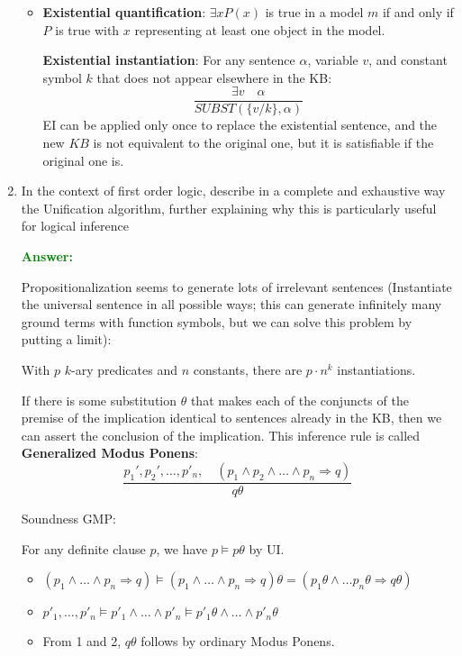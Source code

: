 \documentclass[12pt]{article}
\begin{document}
\begin{enumerate}[label=\textbf{FOL.\arabic*}]
\begin{itemize}
              \item \textbf{Existential quantification}: $\exists x P(x)$ is true in a model $m$ if and only if $P$ is true with $x$ representing at least one object in the model.

                    \textbf{Existential instantiation}: For any sentence $\alpha$, variable $v$, and constant symbol $k$ that does not appear elsewhere in the KB:
                    \begin{equation}
                        \frac{\exists v \quad \alpha}{SUBST(\{v/k\},\alpha)}
                    \end{equation}
                    EI can be applied only once to replace the existential sentence, and the new $KB$ is not equivalent to the original one, but it is satisfiable if the original one is.
          \end{itemize}


    \item In the context of first order logic, describe in a complete and exhaustive way the Unification algorithm, further explaining why this is particularly useful for logical inference

          \textcolor{green}{\textbf{Answer:}}

          Propositionalization seems to generate lots of irrelevant sentences (Instantiate the universal sentence in all possible ways; this can generate infinitely many ground terms with function symbols, but we can solve this problem by putting a limit):
          \begin{center}
              With $p$ $k$-ary predicates and $n$ constants, there are $p \cdot n^k$ instantiations.
          \end{center}

          If there is some substitution $\theta$ that makes each of the conjuncts of the premise of the implication identical to sentences already in the KB, then we can assert the conclusion of the implication. This inference rule is called \textbf{Generalized Modus Ponens}:
          \begin{equation}
              \frac{p_1',p_2',\ldots,p'_n,\quad (p_1\land p_2\land\ldots\land p_n \Rightarrow q)}
              {q\theta}
          \end{equation}

          Soundness GMP:

          For any definite clause $p$, we have $p \vDash p\theta$ by UI.
          \begin{itemize}
              \item $(p_1\land\ldots\land p_n \Rightarrow q) \vDash (p_1\land\ldots\land p_n \Rightarrow q)\theta = (p_1\theta\land\ldots p_n\theta\Rightarrow q\theta)$
              \item $p'_1,\ldots, p'_n \vDash p'_1\land\ldots\land p'_n \vDash p'_1\theta\land\ldots\land p'_n\theta$
              \item From 1 and 2, $q\theta$ follows by ordinary Modus Ponens.
          \end{itemize}


\end{enumerate}
\end{document}
